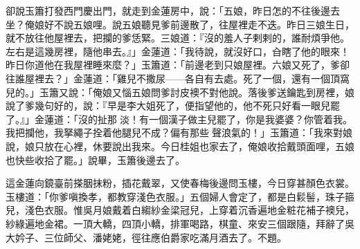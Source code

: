 卻說玉簫打發西門慶出門，就走到金蓮房中，說：「五娘，昨日怎的不往後邊去坐？俺娘好不說五娘哩。說五娘聽見爹前邊散了，往屋裡走不迭。昨日三娘生日，就不放往他屋裡去，把攔的爹恁緊。{}三娘道：『沒的羞人子剌剌的，誰耐煩爭他。左右是這幾房裡，隨他串去。』」{}金蓮道：「我待說，就沒好口，㒲瞎了他的眼來！昨日你道他在我屋裡睡來麼？」玉簫道：「前邊老到只娘屋裡。六娘又死了，爹卻往誰屋裡去？」金蓮道：「雞兒不撒尿——各自有去處。死了一個，還有一個頂窩兒的。」玉簫又說：「俺娘又惱五娘問爹討皮襖不對他說。落後爹送鑰匙到房裡，娘說了爹幾句好的，說：『早是李大姐死了，便指望他的，他不死只好看一眼兒罷了。』」{}金蓮道：「沒的扯那𣭈淡！有一個漢子做主兒罷了，你是我婆婆？你管着我。我把攔他，我拏繩子拴着他腿兒不成？偏有那些𣭈聲浪氣的！」玉簫道：「我來對娘說，娘只放在心裡，休要說出我來。今日桂姐也家去了，俺娘收拾戴頭面哩，五娘也快些收拾了罷。」說畢，玉簫後邊去了。

這金蓮向鏡臺前搽胭抹粉，插花戴翠，又使春梅後邊問玉樓，今日穿甚顏色衣裳。玉樓道：「你爹嗔換孝，都教穿淺色衣服。」五個婦人會定了，都是白鬏髻，珠子箍兒，淺色衣服。惟吳月娘戴着白縐紗金梁冠兒，上穿着沉香遍地金粧花補子襖兒，紗綠遍地金裙。一頂大轎，四頂小轎，排軍喝路，棋童、來安三個跟隨，拜辭了吳大妗子、三位師父、潘姥姥，徑往應伯爵家吃滿月酒去了。不題。

